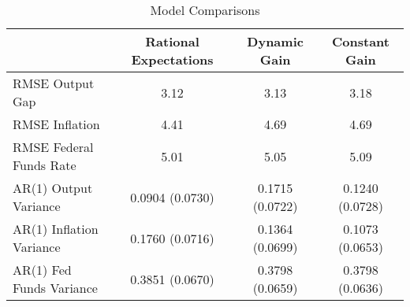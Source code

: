 \begin{sidewaystable}
\begin{center}
\caption{Model Comparisons}\label{tb3:comp}\vspace{2pc}
\begin{tabular}{|l|c|c|c|}\hline
 & Rational Expectations & Dynamic Gain & Constant Gain \\ \hline 
RMSE Output Gap & 3.12 & 3.13 & 3.18 \\ 
RMSE Inflation & 4.41 & 4.69 & 4.69 \\ 
RMSE Federal Funds Rate & 5.01 & 5.05 & 5.09 \\ \hline 
AR(1) Output Variance & 0.0904 (0.0730) & 0.1715 (0.0722) & 0.1240 (0.0728) \\ 
AR(1) Inflation Variance & 0.1760 (0.0716) & 0.1364 (0.0699) & 0.1073 (0.0653) \\ 
AR(1) Fed Funds Variance & 0.3851 (0.0670) & 0.3798 (0.0659) & 0.3798 (0.0636) \\ \hline 
\end{tabular}
\end{center}
\end{sidewaystable}

